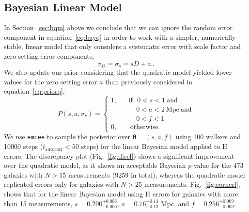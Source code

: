\documentclass[a4paper,fleqn,usenatbib]{mnras}
\begin{document}
\subsection{Bayesian Linear Model}
\label{sec:blm}
In Section~\ref{sec:bqm} above we conclude that we can ignore the random error component in equation~\ref{eq:bayq} in order to work with a simpler, numerically stable, linear model that only considers a systematic error with scale factor and zero setting error components,
\begin{equation}
\sigma_D=\sigma_s=sD+a\ .
	\label{eq:bayl}
\end{equation}
We also update our prior considering that the quadratic model yielded lower values for the zero setting error $a$ than previously considered in equation~\ref{eq:priorq},
\begin{equation}
P(s,a,\sigma_r)=\left\{
\begin{aligned}
1,\ \ \ \ &\mathrm{if}\ \ \ 0<s<1\ \mathrm{and}\\
& \ \ \ \ \  0<a<2\ \mathrm{Mpc}\ \mathrm{and}\\
& \ \ \ \ \  0<f<1\\
0,\ \ \ \ &\ \mathrm{otherwise.}
\end{aligned}
\right.
\end{equation}
We use \texttt{emcee} to sample the posterior over $\pmb{\theta}=(s,a,f)$ using 100 walkers and 10000 steps ($t_\mathrm{autocorr} < 50$ steps) for the linear Bayesian model applied to H errors. The discrepancy plot (Fig.~\ref{fig:discl}) shows a significant improvement over the quadratic model, as it shows an acceptable Bayesian $p$-value for the 473 galaxies with $N>15$ measurements (9259 in total), whereas the quadratic model replicated errors only for galaxies with $N>25$ measurements. Fig.~\ref{fig:cornerl}, shows that for the linear Bayesian model using H errors for galaxies with more than 15 measurements, $s=0.200_{-0.006}^{+0.006}$, $a=0.76_{-0.12}^{+0.13}$ Mpc, and $f=0.256_{-0.009}^{+0.009}$.
\end{document}

